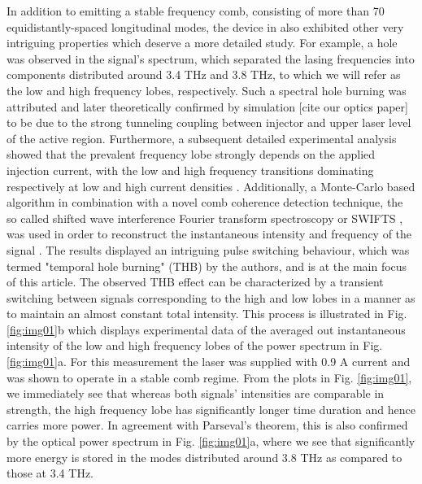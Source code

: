 \documentclass[journal]{IEEEtran}
\begin{document}
In addition to emitting a stable frequency comb, consisting of more than 70 equidistantly-spaced longitudinal modes, the device in \cite{burghoff2014terahertz} also exhibited other very intriguing properties which deserve a more detailed study. For example, a hole was observed in the signal's spectrum, which separated the lasing frequencies into components distributed around 3.4 THz and 3.8 THz, to which we will refer  as the low and high frequency lobes, respectively. Such a spectral hole burning was attributed and later theoretically confirmed by simulation [cite our optics paper] to be due to the strong tunneling coupling between injector and upper laser level of the active region. Furthermore, a subsequent detailed experimental analysis \cite{burghoff2015evaluating} showed that the prevalent frequency lobe strongly depends on the applied injection current, with the low and high frequency transitions dominating respectively at low and high current densities \cite{burghoff2015evaluating}. Additionally, a Monte-Carlo based algorithm in combination with a novel comb coherence detection technique, the so called shifted wave interference Fourier transform spectroscopy or SWIFTS \cite{burghoff2014broadband}, was used in order to reconstruct the instantaneous intensity and frequency of the signal \cite{burghoff2015evaluating}. The results displayed an intriguing pulse switching behaviour, which was termed "temporal hole burning" (THB) by the authors, and is at the main focus of this article. 
The observed THB effect can be characterized by a transient switching between signals corresponding to the high and low lobes in a manner as to maintain an almost constant total intensity. This process is illustrated in Fig. \ref{fig:img01}b which displays experimental data of the averaged out instantaneous intensity of the low and high frequency lobes of the power spectrum in Fig. \ref{fig:img01}a. For this measurement the laser was supplied with 0.9 A current and was shown to operate in a stable comb regime. From the plots in Fig. \ref{fig:img01}, we immediately see that whereas both signals' intensities are comparable in strength, the high frequency lobe has significantly longer time duration and hence carries more power. In agreement with Parseval's theorem, this is also confirmed by the optical power spectrum in Fig. \ref{fig:img01}a, where we see that significantly more energy is stored in the modes distributed around 3.8 THz as compared to those at 3.4 THz. 
\end{document}

